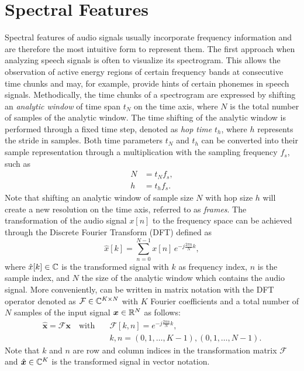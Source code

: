 
\section{Spectral Features}\label{sec:signal_spec}
Spectral features of audio signals usually incorporate frequency information and are therefore the most intuitive form to represent them.
The first approach when analyzing speech signals is often to visualize its spectrogram.
This allows the observation of active energy regions of certain frequency bands at consecutive time chunks and may, for example, provide hints of certain phonemes in speech signals.
Methodically, the time chunks of a spectrogram are expressed by shifting an \emph{analytic window} of time span $t_N$ on the time axis, where $N$ is the total number of samples of the analytic window.
The time shifting of the analytic window is performed through a fixed time step, denoted as \emph{hop time} $t_{h}$, where $h$ represents the stride in samples.
Both time parameters $t_N$ and $t_h$ can be converted into their sample representation through a multiplication with the sampling frequency $f_s$, such as
\begin{equation}
  \begin{split}
    N &= t_N f_s, \\
    h &= t_h f_s.
  \end{split}
\end{equation}
Note that shifting an analytic window of sample size $N$ with hop size $h$ will create a new resolution on the time axis, referred to as \emph{frames}.
The transformation of the audio signal $x[n]$ to the frequency space can be achieved through the Discrete Fourier Transform (DFT) defined as
\begin{equation}\label{eq:signal_spec_dtft}
  \hat{x}[k] = \sum_{n=0}^{N-1} x[n] \, e^{-j\frac{2 \pi n}{N}k},
\end{equation}
where $\hat{x}[k] \in \mathbb{C}$ is the transformed signal with $k$ as frequency index, $n$ is the sample index, and $N$ the size of the analytic window which contains the audio signal.
More conveniently,  can be written in matrix notation with the DFT operator denoted as $\mathcal{F} \in \mathbb{C}^{K \times N}$ with $K$ Fourier coefficients and a total number of $N$ samples of the input signal $\bm{x} \in \mathbb{R}^N$  as follows:
\begin{equation}\label{eq:signal_spec_dtft_matrix}
  \begin{aligned}
    \hat{\bm{x}} = \mathcal{F} \bm{x} \quad \mathrm{with} 
    \quad &\mathcal{F}[k, n] = e^{-j\frac{2 \pi n}{N} k},\\
    &k, n = (0, 1, \dots, K-1), (0, 1, \dots, N-1).
  \end{aligned}
\end{equation}
Note that $k$ and $n$ are row and column indices in the transformation matrix $\mathcal{F}$ and $\hat{\bm{x}} \in \mathbb{C}^K$ is the transformed signal in vector notation.

